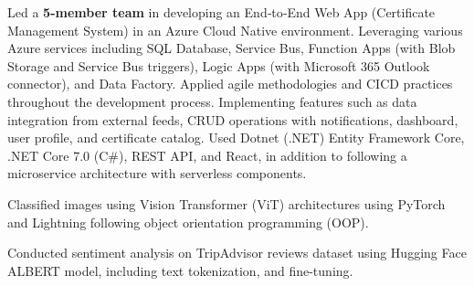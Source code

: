 
\vspace*{-0.2cm}

\begin{cventries}
    \cventry
    {} %
    {} %
    {} %
    {} %
    {
        \begin{cvitemsfree} %
            \item{Led a \textbf{5-member team} in developing an End‑to‑End Web App (Certificate Management System) in an Azure Cloud Native environment. Leveraging various Azure services including SQL Database, Service Bus, Function Apps (with Blob Storage and Service Bus triggers), Logic Apps (with Microsoft 365 Outlook connector), and Data Factory. Applied agile methodologies and CI\/CD practices throughout the development process. Implementing features such as data integration from external feeds, CRUD operations with notifications, dashboard, user profile, and certificate catalog. Used Dotnet (.NET) Entity Framework Core, .NET Core 7.0 (C\#), REST API, and React, in addition to following a microservice architecture with serverless components.}
            \item{Classified images using Vision Transformer (ViT) architectures using PyTorch and Lightning following object orientation programming (OOP).}
            \item{Conducted sentiment analysis on TripAdvisor reviews dataset using Hugging Face ALBERT model, including text tokenization, and fine-tuning.}
        \end{cvitemsfree}
    }
\end{cventries}
